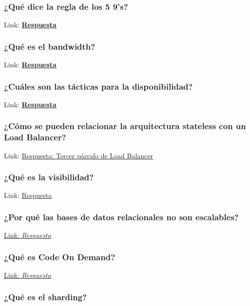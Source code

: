 \documentclass{article}
\begin{document}
    \subsubsection{¿Qué dice la regla de los 5 9's?}

    Link: \textbf{\hyperlink{page.6}{Respuesta}}


    \subsubsection{¿Qué es el bandwidth?}

    Link: \textbf{\hyperlink{page.9}{Respuesta}}

    
    \subsubsection{¿Cuáles son las tácticas para la disponibilidad?}
    
    Link: \textbf{\hyperlink{page.7}{Respuesta}}

    \subsubsection{¿Cómo se pueden relacionar la arquitectura \textbf{stateless} con un \textbf{Load Balancer}?}
    
    Link: \hyperlink{page.23}{Respuesta: Tercer párrafo de Load Balancer}

    \subsubsection{¿Qué es la visibilidad?}
    
    Link: \hyperlink{page.14}{Respuesta}
    
    \subsubsection{¿Por qué las bases de datos relacionales no son escalables?}
    
    \hyperlink{page.45}{Link: \textit{Respuesta}}

    \subsubsection{¿Qué es Code On Demand?}
    
    \hyperlink{page.26}{Link: \textit{Respuesta}}


    \subsubsection{¿Qué es el sharding?}
    
\end{document}

